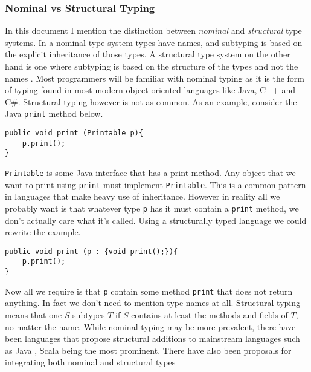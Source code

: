 \documentclass[11pt
              , a4paper
              , twoside
              , openright
              ]{report}
\numberwithin{case}{theorem}
\numberwithin{subcase}{case}
\begin{document}
\subsubsection{Nominal vs Structural Typing}
In this document I mention the distinction between \emph{nominal} and \emph{structural} type systems. In a nominal type system types have names, and subtyping is based on the explicit inheritance of those types. A structural type system on the other hand is one where subtyping is based on the structure of the types and not the names \cite{Cardelli:1988:SSN:73560.73566}. Most programmers will be familiar with nominal typing as it is the form of typing found in most modern object oriented languages like Java, C++ and C\#. Structural typing however is not as common. As an example, consider the Java \verb|print| method below.
\begin{lstlisting}[mathescape, style=customlang]
public void print (Printable p){
	p.print();
}
\end{lstlisting}
\verb|Printable| is some Java interface that has a print method. Any object that we want to print using \verb|print| must implement \verb|Printable|. This is a common pattern in languages that make heavy use of inheritance. However in reality all we probably want is that whatever type \verb|p| has it must contain a \verb|print| method, we don't actually care what it's called. Using a structurally typed language we could rewrite the example.
\begin{lstlisting}[mathescape, style=customlang]
public void print (p : {void print();}){
	p.print();
}
\end{lstlisting}
Now all we require is that \verb|p| contain some method \verb|print| that does not return anything. In fact we don't need to mention type names at all. Structural typing means that one $S$ subtypes $T$ if $S$ contains at least the methods and fields of $T$, no matter the name. While nominal typing may be more prevalent, there have been languages that propose structural additions to mainstream languages such as Java \cite{Gil:2008:WIS:1449764.1449771}, Scala being the most prominent. There have also been proposals for integrating both nominal and structural types \cite{Malayeri07integratingnominal, Jones:2015:brands, Ostermann_nominaland}
\end{document}
